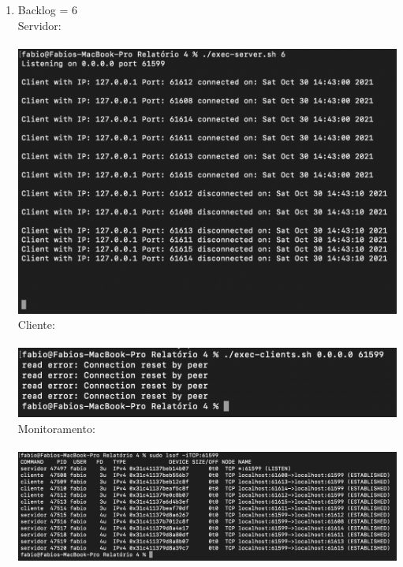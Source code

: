 \documentclass[12pt,a4paper]{report}
\begin{document}
\begin{enumerate}
\begin{enumerate}
        \item Backlog = 6\\
        Servidor:\\\\
        \includegraphics[width=1\textwidth]{images/servidor-backlog-6.png}
        Cliente:\\\\
        \includegraphics[width=1\textwidth]{images/cliente-backlog-6.png}
        Monitoramento:\\\\
        \includegraphics[width=1\textwidth]{images/lsof-backlog-6.png}
        

\end{enumerate}
\end{enumerate}
\end{document}
